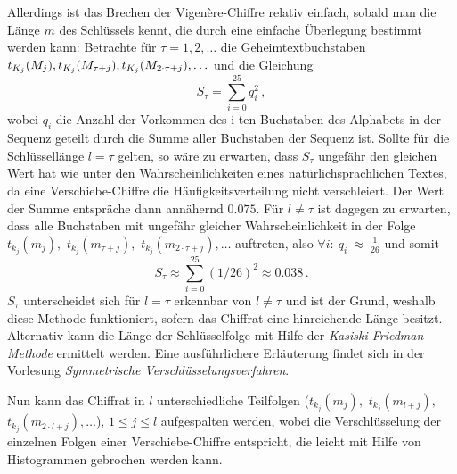 Allerdings ist das Brechen der Vigenère-Chiffre relativ einfach, sobald
man die Länge $m$ des Schlüssels kennt, die durch eine einfache
Überlegung bestimmt werden kann: Betrachte für $\tau = 1,2,\ldots$ die
Geheimtextbuchstaben
$t_{K_j}(M_j),t_{K_j}(M_{\tau+j}),t_{K_j}(M_{2
  \cdot \tau+j}),\ldots$ und die Gleichung 
\begin{equation*}
	S_{\tau}=	\sum_{i=0}^{25} q^2_i \, ,
\end{equation*}
wobei $q_i$ die Anzahl der Vorkommen des i-ten Buchstaben des Alphabets
in der Sequenz geteilt durch die Summe aller Buchstaben der Sequenz
ist. Sollte für die Schlüssellänge $l = \tau$ gelten, so wäre zu
erwarten, dass $S_{\tau}$ ungefähr den gleichen Wert hat wie unter den
Wahrscheinlichkeiten eines natürlichsprachlichen Textes, da eine
Verschiebe-Chiffre die Häufigkeitsverteilung nicht verschleiert. Der
Wert der Summe entspräche dann annähernd $0.075$.  Für $l \neq \tau$ ist
dagegen zu erwarten, dass alle Buchstaben mit ungefähr gleicher
Wahrscheinlichkeit in der Folge $t_{k_j}(m_j),$ $t_{k_j}(m_{\tau+j}),$
$t_{k_j}(m_{2 \cdot \tau+j}),\ldots$ auftreten, also $\forall
i\colon~q_i~\approx~\frac{1}{26}$ und somit
\begin{equation*}
  S_{\tau} \approx \sum_{i=0}^{25} (1/26)^2 \approx 0.038 \,\text{.}
\end{equation*}
$S_{\tau}$ unterscheidet sich für $l = \tau$ erkennbar von $l \neq \tau$
und ist der Grund, weshalb diese Methode funktioniert, sofern das
Chiffrat eine hinreichende Länge besitzt. Alternativ kann die Länge der
Schlüsselfolge mit Hilfe der \emph{Kasiski-Friedman-Methode}
\cite{Kasiski1863} ermittelt werden. Eine ausführlichere Erläuterung
findet sich in der Vorlesung \emph{Symmetrische
  Verschlüsselungsverfahren}\cite{Geiselmann2016}. 

Nun kann das Chiffrat in $l$ unterschiedliche Teilfolgen
($t_{k_j}(m_j),$ $t_{k_j}(m_{l+j}),$ $t_{k_j}(m_{2 \cdot l+j}),\ldots$),
$1 \leq j \leq l$ aufgespalten werden, wobei die Verschlüsselung der
einzelnen Folgen einer Verschiebe-Chiffre entspricht, die leicht mit
Hilfe von Histogrammen gebrochen werden kann. 


